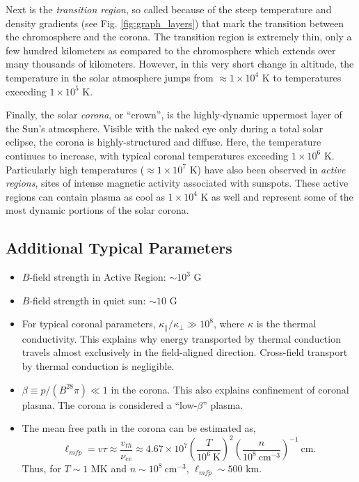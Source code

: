 	Next is the \textit{transition region}, so called because of the steep temperature and density gradients (see Fig. \ref{fig:graph_layers}) that mark the transition between the chromosphere and the corona. The transition region is extremely thin, only a few hundred kilometers as compared to the chromosphere which extends over many thousands of kilometers. However, in this very short change in altitude, the temperature in the solar atmosphere jumps from $\approx1\times10^4$ K to temperatures exceeding $1\times10^5$ K. 

	Finally, the solar \textit{corona}, or ``crown'', is the highly-dynamic uppermost layer of the Sun's atmosphere. Visible with the naked eye only during a total solar eclipse, the corona is highly-structured and diffuse. Here, the temperature continues to increase, with typical coronal temperatures exceeding $1\times10^6$ K. Particularly high temperatures ($\approx1\times10^7$ K) have also been observed in \textit{active regions}, sites of intense magnetic activity associated with sunspots. These active regions can contain plasma as cool as $1\times10^4$ K as well and represent some of the most dynamic portions of the solar corona.
	\subsection{Additional Typical Parameters}
	\begin{itemize}
		\item $B$-field strength in Active Region: $\sim10^3$ G
		\item $B$-field strength in quiet sun: $\sim10$ G
		\item For typical coronal parameters, $\kappa_{\parallel}/\kappa_{\perp}\gg10^{8}$, where $\kappa$ is the thermal conductivity. This explains why energy transported by thermal conduction travels almost exclusively in the field-aligned direction. Cross-field transport by thermal conduction is negligible. 
		\item $\beta\equiv p/(B^28\pi)\ll1$ in the corona. This also explains confinement of coronal plasma. The corona is considered a ``low-$\beta$'' plasma.
		\item The mean free path in the corona can be estimated as,
		\begin{equation}
			\ell_{mfp}=v\tau\approx \frac{v_{th}}{\nu_{ee}}\approx 4.67\times10^{7}\left(\frac{T}{10^6~\mathrm{K}}\right)^2\left(\frac{n}{10^8~\mathrm{cm}^{-3}}\right)^{-1}~\mathrm{cm}.
		\end{equation}
		Thus, for $T\sim1$ MK and $n\sim10^8~\mathrm{cm}^{-3}$, $\ell_{mfp}\sim500$ km. 
	\end{itemize}

